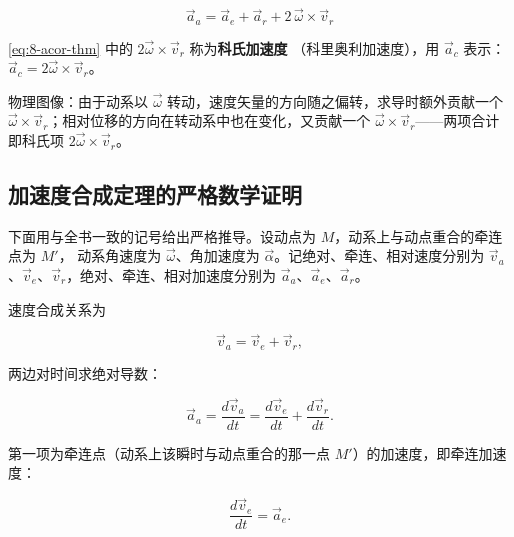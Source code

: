 \begin{theorem}[加速度合成定理]\label{thm:8-acor}

\begin{equation}\label{eq:8-acor-thm}
  \boxed{\ \vec a_a = \vec a_e + \vec a_r + 2\,\vec\omega\times\vec v_r\ }
\end{equation}
\end{theorem}

\begin{definition}[科氏加速度]\label{def:8-cor}
\eqref{eq:8-acor-thm} 中的 $2\vec\omega\times\vec v_r$ 称为\textbf{科氏加速度}
（科里奥利加速度），用 $\vec a_c$ 表示：$\vec a_c = 2\vec\omega\times\vec v_r$。
\end{definition}

物理图像：由于动系以 $\vec\omega$ 转动，速度矢量的方向随之偏转，求导时额外贡献一个
$\vec\omega\times\vec v_r$；相对位移的方向在转动系中也在变化，又贡献一个
$\vec\omega\times\vec v_r$——两项合计即科氏项 $2\vec\omega\times\vec v_r$。

\subsection{加速度合成定理的严格数学证明}

下面用与全书一致的记号给出严格推导。设动点为 $M$，动系上与动点重合的牵连点为 $M'$，
动系角速度为 $\vec\omega$、角加速度为 $\vec\alpha$。记绝对、牵连、相对速度分别为
$\vec v_a$、$\vec v_e$、$\vec v_r$，绝对、牵连、相对加速度分别为 $\vec a_a$、$\vec a_e$、$\vec a_r$。

速度合成关系为

\begin{equation}\label{eq:8-proof-vsum}
  \vec v_a = \vec v_e + \vec v_r ,
\end{equation}

两边对时间求绝对导数：

\begin{equation}\label{eq:8-proof-diff}
  \vec a_a = \frac{d\vec v_a}{dt}
          = \frac{d\vec v_e}{dt} + \frac{d\vec v_r}{dt} .
\end{equation}

第一项为牵连点（动系上该瞬时与动点重合的那一点 $M'$）的加速度，即牵连加速度：

\begin{equation}\label{eq:8-proof-aop}
  \frac{d\vec v_e}{dt} = \vec a_e .
\end{equation}

